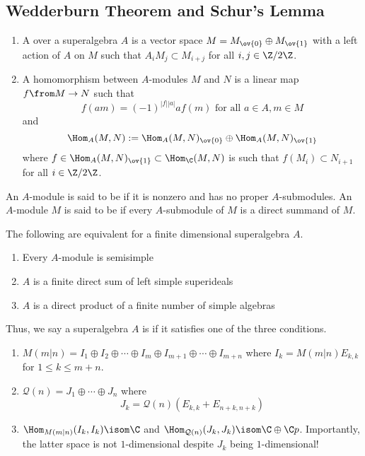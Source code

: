\documentclass[11pt,leqno,oneside]{amsbook}
\renewcommand{\Q}{\mathcal{Q}}
\numberwithin{thm}{section}
\begin{document}
\subsection{Wedderburn Theorem and Schur's Lemma}
\begin{defn}
  \begin{enumerate}
  \item   A  over a superalgebra \(A\) is a vector space \(M
  = M_{\ov{0}} \oplus M_{\ov{1}}\) with a left action of \(A\) on
  \(M\) such that \(A_i M_j \subset M_{i+j}\) for all \(i,j \in \Z/2\Z\).
  \item A homomorphism between \(A\)-modules \(M\) and \(N\) is a
    linear map \(f \from M \to N\) such that \[
      f(am) = (-1)^{|f||a|} a f(m) \text{ for all }a \in A, m \in M
    \]
    and \[
      \Hom_A(M,N) := \Hom_A(M,N)_{\ov{0}} \oplus \Hom_A(M,N)_{\ov{1}}
    \]
    where \(f \in \Hom_A(M,N)_{\ov{1}} \subset \Hom_\C(M,N)\) is such that
    \(f(M_i) \subset N_{i+1}\) for all \(i \in \Z/2\Z\).
  \end{enumerate}
\end{defn}
\begin{defn}
  An \(A\)-module is said to be  if it is nonzero and has no
  proper \(A\)-submodules. An \(A\)-module \(M\) is said to be
   if every \(A\)-submodule of \(M\) is a direct
  summand of \(M\).
\end{defn}
\begin{thm}
  The following are equivalent for a finite dimensional superalgebra \(A\).
  \begin{enumerate}
  \item Every \(A\)-module is semisimple
  \item \(A\) is a finite direct sum of left simple superideals
  \item \(A\) is a direct product of a finite number of simple algebras
  \end{enumerate}
\end{thm}
\begin{defn}
  Thus, we say a superalgebra \(A\) is  if it satisfies
  one of the three conditions.
\end{defn}
\begin{example}
  \begin{enumerate}
  \item \(M(m|n) = I_1 \oplus I_2 \oplus \cdots \oplus I_m \oplus
    I_{m+1} \oplus \cdots \oplus I_{m+n}\) where \(I_k =
    M(m|n)E_{k,k}\) for \(1 \leq k \leq m+n\).
  \item \(\Q(n) = J_1 \oplus \cdots \oplus J_n\) where \[
      J_k = \Q(n) (E_{k,k} + E_{n+k,n+k})
    \]
  \item \(\Hom_{M(m|n)}(I_k, I_k) \isom \C\) and \(\Hom_{\Q(n)}(J_k,
    J_k) \isom \C \oplus \C p\). Importantly, the latter space is not
    \(1\)-dimensional despite \(J_k\) being \(1\)-dimensional!
  \end{enumerate}
\end{example}
\end{document}

